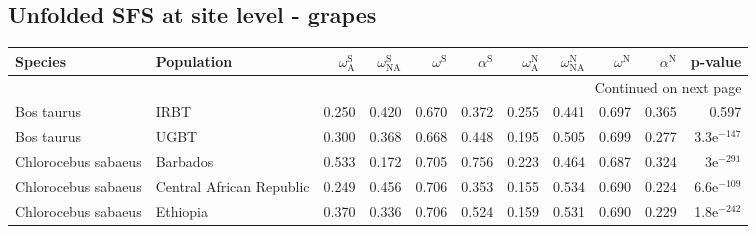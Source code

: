 \subsection{Unfolded SFS at site level - grapes} 
\begin{longtable}{llrrrrrrrrr}
\toprule
             Species &                Population & $\omega_{\textrm{A}}^{\textrm{S}}$ & $\omega_{\textrm{NA}}^{\textrm{S}}$ & $\omega^{\textrm{S}}$ & $\alpha^{\textrm{S}}$ & $\omega_{\textrm{A}}^{\textrm{N}}$ & $\omega_{\textrm{NA}}^{\textrm{N}}$ & $\omega^{\textrm{N}}$ & $\alpha^{\textrm{N}}$ &       p-value \\
\midrule
\endhead
\midrule
\multicolumn{11}{r}{{Continued on next page}} \\
\midrule
\endfoot

\bottomrule
\endlastfoot
          Bos taurus &                      IRBT &                              0.250 &                               0.420 &                 0.670 &                 0.372 &                              0.255 &                               0.441 &                 0.697 &                 0.365 &         0.597 \\
          Bos taurus &                      UGBT &                              0.300 &                               0.368 &                 0.668 &                 0.448 &                              0.195 &                               0.505 &                 0.699 &                 0.277 & 3.3e$^{-147}$ \\
 Chlorocebus sabaeus &                  Barbados &                              0.533 &                               0.172 &                 0.705 &                 0.756 &                              0.223 &                               0.464 &                 0.687 &                 0.324 &   3e$^{-291}$ \\
 Chlorocebus sabaeus &  Central African Republic &                              0.249 &                               0.456 &                 0.706 &                 0.353 &                              0.155 &                               0.534 &                 0.690 &                 0.224 & 6.6e$^{-109}$ \\
 Chlorocebus sabaeus &                  Ethiopia &                              0.370 &                               0.336 &                 0.706 &                 0.524 &                              0.159 &                               0.531 &                 0.690 &                 0.229 & 1.8e$^{-242}$ \\

\end{longtable}
